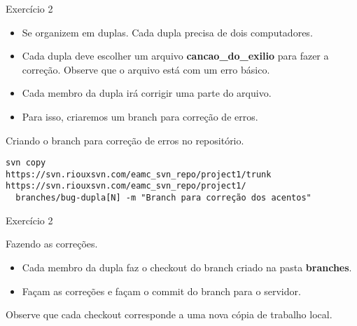 \documentclass[a4paper]{beamer}
\begin{document}
\begin{frame}[fragile]{Exercício 2}

\begin{itemize}
\item Se organizem em duplas. Cada dupla precisa de dois computadores.
\item Cada dupla deve escolher um arquivo \textbf{cancao\_do\_exilio} para fazer a correção. Observe que o arquivo está com um erro básico.
\item Cada membro da dupla irá corrigir uma parte do arquivo.
\item Para isso, criaremos um branch para correção de erros.
\end{itemize}

\pause
\vspace{10pt}
Criando o branch para correção de erros no repositório.
\begin{verbatim}
svn copy
https://svn.riouxsvn.com/eamc_svn_repo/project1/trunk
https://svn.riouxsvn.com/eamc_svn_repo/project1/
  branches/bug-dupla[N] -m "Branch para correção dos acentos"
\end{verbatim}

\end{frame}

\begin{frame}{Exercício 2}

Fazendo as correções.
\begin{itemize}
\item Cada membro da dupla faz o checkout do branch criado na pasta \textbf{branches}.
\item Façam as correções e façam o commit do branch para o servidor.
\end{itemize}

\pause
\begin{block}{}
Observe que cada checkout corresponde a uma nova cópia de trabalho local.
\end{block}

\end{frame}
\end{document}

